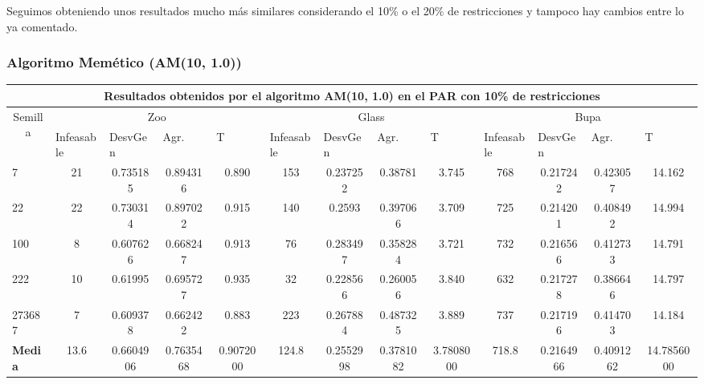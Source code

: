 Seguimos obteniendo unos resultados mucho más similares considerando el 10\% o el 20\% de restricciones y tampoco hay cambios entre lo ya comentado.

\subsubsection{Algoritmo Memético (AM(10, 1.0))}


\begin{table}[H]
	\tiny

	\begin{adjustwidth}{-1cm}{-1cm}%
	
	\begin{tabular}{|l|c|c|c|c|c|c|c|c|c|c|c|c|}
	\hline
	\multicolumn{13}{|c|}{\textbf{Resultados obtenidos por el algoritmo AM(10, 1.0) en el PAR con 10\% de restricciones}}                                                                                                                                                                                                                                                                                                                                            \\ \hline
	\multicolumn{1}{|c|}{\multirow{2}{*}{Semilla}} & \multicolumn{4}{c|}{Zoo}                                                                                          & \multicolumn{4}{c|}{Glass}                                                                                         & \multicolumn{4}{c|}{Bupa}                                                                                          \\ \cline{2-13} 
	\multicolumn{1}{|c|}{}                                  & \multicolumn{1}{l|}{Infeasable} & \multicolumn{1}{l|}{DesvGen} & \multicolumn{1}{l|}{Agr.} & \multicolumn{1}{l|}{T} & \multicolumn{1}{l|}{Infeasable} & \multicolumn{1}{l|}{DesvGen} & \multicolumn{1}{l|}{Agr.} & \multicolumn{1}{l|}{T} & \multicolumn{1}{l|}{Infeasable} & \multicolumn{1}{l|}{DesvGen} & \multicolumn{1}{l|}{Agr.} & \multicolumn{1}{l|}{T} \\ \hline
	7   	& 21 & 0.735185 & 0.894316 & 0.890 &				153 & 0.237252 & 0.38781 & 3.745 &			 	768 & 0.217242 & 0.423057 & 14.162		\\ \hline
	22 		& 22 & 0.730314 & 0.897022 & 0.915 &				140 & 0.2593 & 0.397066 & 3.709 &		 	725 & 0.214201 & 0.408492 & 14.994		\\ \hline
	100 	& 8 & 0.607626 & 0.668247 & 0.913 &				76 & 0.283497 & 0.358284 & 3.721 &				732 & 0.216566 & 0.412733 & 14.791		\\ \hline
	222 	& 10 & 0.61995 & 0.695727 & 0.935 &				32 & 0.228566 & 0.260056 & 3.840 & 			632 & 0.217278 & 0.386646 & 14.797			\\ \hline
	273687 	& 7 & 0.609378 & 0.662422 & 0.883 &				223 & 0.267884 & 0.487325 & 3.889 &			737 & 0.217196 & 0.414703 & 14.184		\\ \hline
	\textbf{Media} &  13.6 & 	0.6604906 & 	0.7635468 & 	0.9072000 & 	124.8 & 	0.2552998 & 	0.3781082 & 	3.7808000 & 	718.8 & 	0.2164966 & 	0.4091262 & 	14.7856000   \\ \hline
	\end{tabular}
	

\end{adjustwidth}
\end{table}
